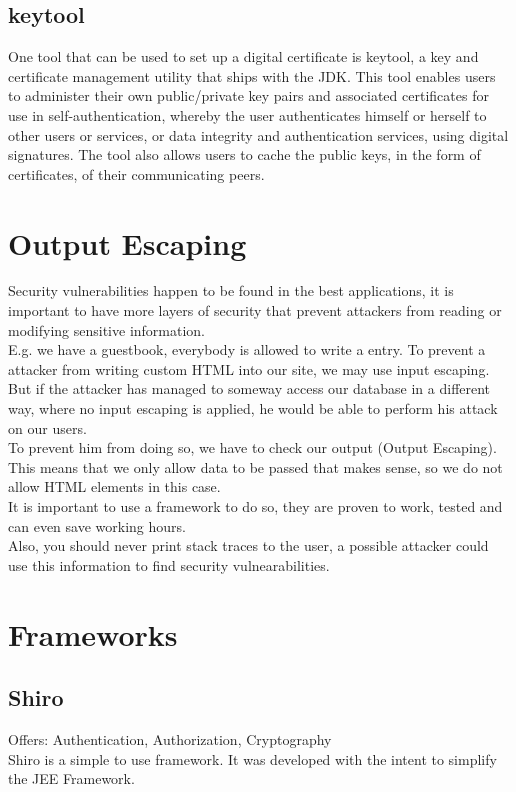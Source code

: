 \documentclass[12pt,a4paper]{report}
\begin{document}
\section{keytool}
One tool that can be used to set up a digital certificate is keytool, a key and certificate management utility that ships with the JDK. This tool enables users to administer their own public/private key pairs and associated certificates for use in self-authentication, whereby the user authenticates himself or herself to other users or services, or data integrity and authentication services, using digital signatures. The tool also allows users to cache the public keys, in the form of certificates, of their communicating peers.

\chapter{Output Escaping}
Security vulnerabilities happen to be found in the best applications, it is important to have more layers of security that prevent attackers from reading or modifying sensitive information.\\
E.g. we have a guestbook, everybody is allowed to write a entry. To prevent a attacker from writing custom HTML into our site, we may use input escaping. But if the attacker has managed to someway access our database in a different way, where no input escaping is applied, he would be able to perform his attack on our users.\\
To prevent him from doing so, we have to check our output (Output Escaping). This means that we only allow data to be passed that makes sense, so we do not allow HTML elements in this case.\\
It is important to use a framework to do so, they are proven to work, tested and can even save working hours.\\
Also, you should never print stack traces to the user, a possible attacker could use this information to find security vulnearabilities.

\chapter{Frameworks}
\section{Shiro}
Offers: Authentication, Authorization, Cryptography\\
Shiro is a simple to use framework. It was developed with the intent to simplify the JEE Framework.\\\\
\end{document}
